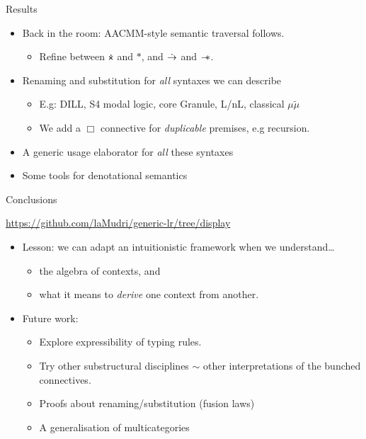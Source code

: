 \documentclass[fleqn]{beamer}
\begin{document}

\begin{frame}{Results}
  \begin{itemize}
    \item Back in the room: AACMM-style semantic traversal follows.
      \begin{itemize}
        \item Refine between $\dottimes$ and $*$, and $\mathrel{\dot\to}$ and $\mathrel{\mathord{-}\hspace{-0.75ex}*}$.
      \end{itemize}
    \item Renaming and substitution for \emph{all} syntaxes we can describe
      \begin{itemize}
        \item E.g: DILL, S4 modal logic, core Granule, L/nL, classical $\mu\tilde\mu$
        \item We add a $\Box$ connective for \emph{duplicable} premises, e.g recursion.
      \end{itemize}
    \item A generic usage elaborator for \emph{all} these syntaxes
    \item Some tools for denotational semantics
  \end{itemize}
\end{frame}

\begin{frame}{Conclusions}
  \begin{center}
    \url{https://github.com/laMudri/generic-lr/tree/display}
  \end{center}
  \begin{itemize}
    \item Lesson: we can adapt an intuitionistic framework when we understand\ldots
      \begin{itemize}
        \item the algebra of contexts, and
        \item what it means to \emph{derive} one context from another.
      \end{itemize}
    \item Future work:
      \begin{itemize}
        \item Explore expressibility of typing rules.
        \item Try other substructural disciplines $\sim$ other interpretations of the bunched connectives.
        \item Proofs about renaming/substitution (fusion laws)
        \item A generalisation of multicategories
      \end{itemize}
  \end{itemize}
\end{frame}

%  
%  
\end{document}
